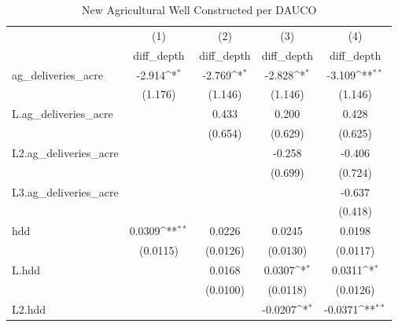 \begin{table}[htbp]\centering
\def\sym#1{\ifmmode^{#1}\else\(^{#1}\)\fi}
\caption{New Agricultural Well Constructed per DAUCO}
\begin{tabular}{l*{4}{c}}
\hline\hline
                    &\multicolumn{1}{c}{(1)}&\multicolumn{1}{c}{(2)}&\multicolumn{1}{c}{(3)}&\multicolumn{1}{c}{(4)}\\
                    &\multicolumn{1}{c}{diff\_depth}&\multicolumn{1}{c}{diff\_depth}&\multicolumn{1}{c}{diff\_depth}&\multicolumn{1}{c}{diff\_depth}\\
\hline
ag\_deliveries\_acre  &      -2.914\sym{*}  &      -2.769\sym{*}  &      -2.828\sym{*}  &      -3.109\sym{**} \\
                    &     (1.176)         &     (1.146)         &     (1.146)         &     (1.146)         \\
[1em]
L.ag\_deliveries\_acre&                     &       0.433         &       0.200         &       0.428         \\
                    &                     &     (0.654)         &     (0.629)         &     (0.625)         \\
[1em]
L2.ag\_deliveries\_acre&                     &                     &      -0.258         &      -0.406         \\
                    &                     &                     &     (0.699)         &     (0.724)         \\
[1em]
L3.ag\_deliveries\_acre&                     &                     &                     &      -0.637         \\
                    &                     &                     &                     &     (0.418)         \\
[1em]
hdd                 &      0.0309\sym{**} &      0.0226         &      0.0245         &      0.0198         \\
                    &    (0.0115)         &    (0.0126)         &    (0.0130)         &    (0.0117)         \\
[1em]
L.hdd               &                     &      0.0168         &      0.0307\sym{*}  &      0.0311\sym{*}  \\
                    &                     &    (0.0100)         &    (0.0118)         &    (0.0126)         \\
[1em]
L2.hdd              &                     &                     &     -0.0207\sym{*}  &     -0.0371\sym{**} \\

\end{tabular}
\end{table}
